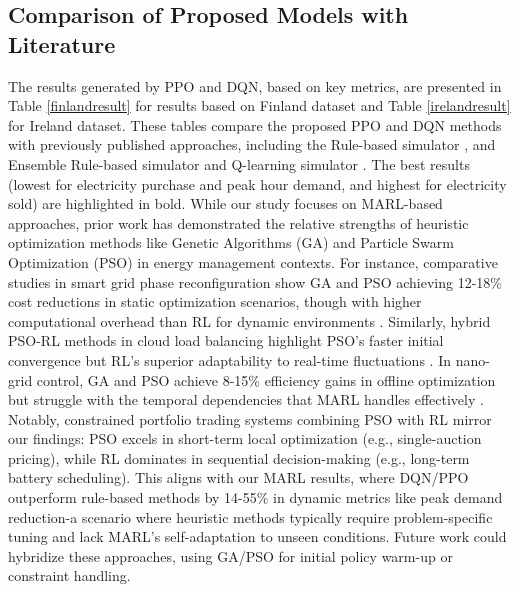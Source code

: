 \documentclass[preprint,12pt]{elsarticle}
\begin{document}
\subsection{Comparison of Proposed Models with Literature}



The results generated by PPO and DQN, based on key metrics, are presented in Table \ref{finlandresult} for results based on Finland dataset and Table \ref{irelandresult} for Ireland dataset. These tables compare the proposed PPO and DQN methods with previously published approaches, including the Rule-based simulator \cite{shah2024peer}, and Ensemble Rule-based simulator and Q-learning simulator \cite{shah2024reinforcement}. The best results (lowest for electricity purchase and peak hour demand, and highest for electricity sold) are highlighted in bold. While our study focuses on MARL-based approaches, prior work has demonstrated the relative strengths of heuristic optimization methods like Genetic Algorithms (GA) and Particle Swarm Optimization (PSO) in energy management contexts. For instance, comparative studies in smart grid phase reconfiguration show GA and PSO achieving 12-18\% cost reductions in static optimization scenarios, though with higher computational overhead than RL for dynamic environments \cite{islam2019comparison}. Similarly, hybrid PSO-RL methods in cloud load balancing highlight PSO's faster initial convergence but RL's superior adaptability to real-time fluctuations \cite{pradhan2022intelligent}. In nano-grid control, GA and PSO achieve 8-15\% efficiency gains in offline optimization but struggle with the temporal dependencies that MARL handles effectively \cite{yousaf2020comparative}. Notably, constrained portfolio trading systems combining PSO with RL \cite{almahdi2019constrained} mirror our findings: PSO excels in short-term local optimization (e.g., single-auction pricing), while RL dominates in sequential decision-making (e.g., long-term battery scheduling). This aligns with our MARL results, where DQN/PPO outperform rule-based methods by 14-55\% in dynamic metrics like peak demand reduction-a scenario where heuristic methods typically require problem-specific tuning and lack MARL's self-adaptation to unseen conditions. Future work could hybridize these approaches, using GA/PSO for initial policy warm-up or constraint handling.
\end{document}
